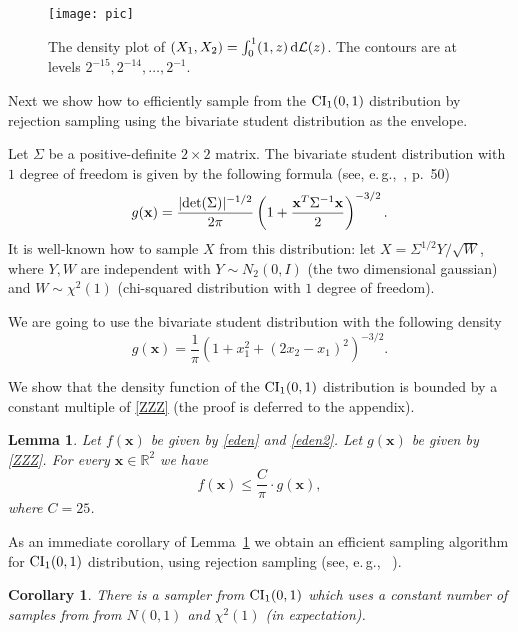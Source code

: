 \documentclass[11pt]{article}
\def\R{{\mathbb R}}
\def\({\left(} \def\){\right)} \def\hatU{\widehat{U}}
\newtheorem{lem}[thm]{Lemma}
\newtheorem{cor}[thm]{Corollary}
\def\BLEM{\begin{lem}}
\def\ELEM{\end{lem}}
\def\BCOR{\begin{cor}}
\def\ECOR{\end{cor}}
\begin{document}
\begin{figure}[htb]
    \begin{center}
        \texttt{[image: pic]}
      \caption{The density plot of $(X_1,X_2)=\int_{0}^1 (1,z)\,{\rm d}{\cal L}(z)$.
      The contours are at levels $2^{-15},2^{-14},\dots,2^{-1}$.
      }
      \label{fig:piecewise}
    \end{center}
\end{figure}


Next we show how to efficiently sample from the ${\rm CI}_1(0,1)$ distribution
by rejection sampling using the bivariate student distribution
as the envelope.

Let $\Sigma$ be a positive-definite $2\times 2$ matrix. The bivariate
student distribution with $1$ degree of freedom is given by the following formula
(see, e.\,g.,~\cite{ES00}, p.~50)
$$
g({\mathbf x})=\frac{|{\rm det}(\Sigma)|^{-1/2}}{2\pi}\(1+\frac{{\mathbf x}^T \Sigma^{-1} {\mathbf x}}{2}\)^{-3/2}.
$$
It is well-known how to sample $X$ from this distribution: let $X=\Sigma^{1/2} Y /\sqrt{W}$,
where $Y,W$ are independent with $Y\sim N_2(0,I)$ (the two dimensional gaussian) and
$W\sim\chi^2(1)$ (chi-squared distribution with $1$ degree of freedom).

We are going to use the bivariate student distribution with the following density
\begin{equation}\label{ZZZ}
g({\mathbf x})=\frac{1}{\pi}\(1+x_1^2+(2x_2-x_1)^2\)^{-3/2}.
\end{equation}

We show that the density function of the ${\rm CI}_1(0,1)$ distribution
is bounded by a constant multiple of \eqref{ZZZ} (the proof is deferred to
the appendix).

\BLEM\label{kkkk}
Let $f({\mathbf x})$ be given by \eqref{eden} and \eqref{eden2}. Let
$g({\mathbf x})$ be given by \eqref{ZZZ}. For every ${\mathbf x}\in\R^2$ we
have
\begin{equation*}\label{BOO}
f({\mathbf x})\leq \frac{C}{\pi}\cdot g({\mathbf x}),
\end{equation*}
where $C=25$.
\ELEM

As an immediate corollary of Lemma~\ref{kkkk} we obtain an efficient sampling
algorithm for ${\rm CI}_1(0,1)$ distribution, using rejection sampling (see, e.\,g.,
~\cite{ES00}).

\BCOR\label{cansample}
There is a sampler from ${\rm CI}_1(0,1)$ which uses
a constant number of samples from from $N(0,1)$ and $\chi^2(1)$
(in expectation).
\ECOR
\end{document}
